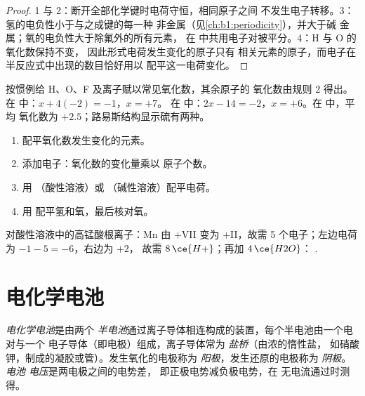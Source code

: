 \begin{proof}
1 与 2：断开全部化学键时电荷守恒，相同原子之间
不发生电子转移。3：氢的电负性小于与之成键的每一种
非金属（见\cref{ch:b1:periodicity}），并大于碱
金属；氧的电负性大于除氟外的所有元素，
在  中共用电子对被平分。4：H 与 O 的氧化数保持不变，
因此形式电荷发生变化的原子只有
相关元素的原子，而电子在半反应式中出现的数目恰好用以
配平这一电荷变化。
\end{proof}

\begin{method}[物种的氧化数]\label{met:b1:nernst:oxidation-numbers}
按惯例给 H、O、F 及离子赋以常见氧化数，其余原子的
氧化数由规则 2 得出。在  中：$x + 4(-2) = -1$，$x = +7$。
在  中：$2x - 14 = -2$，$x = +6$。在  中，平均
氧化数为 $+2.5$；路易斯结构显示硫有两种。
\end{method}

\begin{method}[配平半反应式]\label{met:b1:nernst:balance-by-on}
\begin{enumerate}
  \item 配平氧化数发生变化的元素。
  \item 添加电子：氧化数的变化量乘以
        原子个数。
  \item 用 （酸性溶液）或 
        （碱性溶液）配平电荷。
  \item 用  配平氢和氧，最后核对氧。
\end{enumerate}
对酸性溶液中的高锰酸根离子：Mn 由 $+$VII 变为 $+$II，故需 5
个电子；左边电荷为 $-1 - 5 = -6$，右边为 $+2$，
故需 $8\,\ce{H+}$；再加 $4\,\ce{H2O}$：
.
\end{method}

\section{电化学电池}

\begin{definition}[电化学电池]\label{def:b1:nernst:cell}
\emph{电化学电池}是由两个
\emph{半电池}通过离子导体相连构成的装置，每个半电池由一个电对与一个
电子导体（即电极）组成，离子导体常为
\emph{盐桥}（由浓的惰性盐，
如硝酸钾，制成的凝胶或管）。发生氧化的电极称为
\emph{阳极}，发生还原的电极称为
\emph{阴极}。\emph{电池
电压}是两电极之间的电势差，
即正极电势减负极电势，在
无电流通过时测得。
\end{definition}

